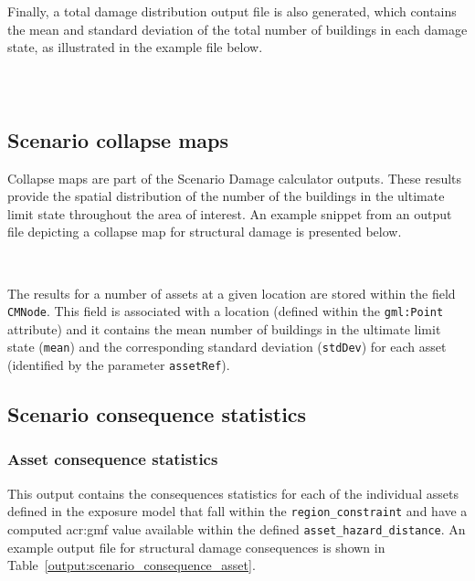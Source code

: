 Finally, a total damage distribution output file is also generated, which contains
the mean and standard deviation of the total number of buildings in each
damage state, as illustrated in the example file below.

\inputminted[firstline=1,firstnumber=1,fontsize=\footnotesize,frame=single,linenos,bgcolor=lightgray]{xml}{oqum/risk/verbatim/output_scenario_damage_total.xml}\\


\subsection{Scenario collapse maps}
\label{subsec:scenario_collapse_map}

Collapse maps are part of the Scenario Damage calculator outputs. These
results provide the spatial distribution of the number of the buildings in the
ultimate limit state throughout the area of interest. An example snippet from
an output file depicting a collapse map for structural damage is presented
below.

\inputminted[firstline=1,firstnumber=1,fontsize=\footnotesize,frame=single,bgcolor=lightgray]{xml}{oqum/risk/verbatim/output_scenario_damage_collapse.xml}\\

The results for a number of \glspl{asset} at a given location are stored
within the field \Verb+CMNode+. This field is associated with a location
(defined within the \Verb+gml:Point+ attribute) and it contains the mean
number of buildings in the ultimate limit state (\Verb+mean+) and the
corresponding standard deviation (\Verb+stdDev+) for each \gls{asset}
(identified by the parameter \Verb+assetRef+).


\subsection{Scenario consequence statistics}
\label{subsec:scenario_consequence_statistics}

\subsubsection{Asset consequence statistics}
\label{subsubsec:scenario_asset_consequence_statistics}

This output contains the consequences statistics for each of the individual
\glspl{asset} defined in the \gls{exposure model} that fall within the
\Verb+region_constraint+ and have a computed \gls{acr:gmf} value available
within the defined \Verb+asset_hazard_distance+. An example output file for
structural damage consequences is shown in
Table~\ref{output:scenario_consequence_asset}.

